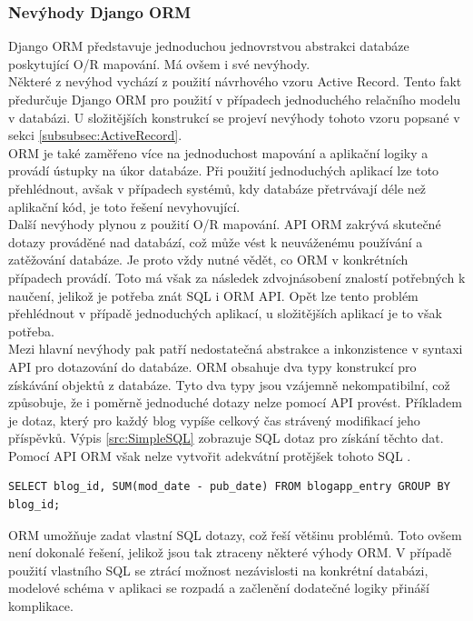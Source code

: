 \documentclass[ing,male,java,dept456]{diploma}						%
\begin{document}
\subsubsection{Nevýhody Django ORM}

Django ORM představuje jednoduchou jednovrstvou abstrakci databáze poskytující O/R mapování. Má ovšem i své nevýhody. \\
Některé z nevýhod vychází z použití návrhového vzoru Active Record. Tento fakt předurčuje Django ORM pro použití v případech jednoduchého relačního modelu v databázi. U složitějších konstrukcí se projeví nevýhody tohoto vzoru popsané v sekci \ref{subsubsec:ActiveRecord}. \\
ORM je také zaměřeno více na jednoduchost mapování a aplikační logiky a provádí ústupky na úkor databáze. Při použití jednoduchých aplikací lze toto přehlédnout, avšak v případech systémů, kdy databáze přetrvávají déle než aplikační kód, je toto řešení nevyhovující. \\
Další nevýhody plynou z použití O/R mapování. API ORM zakrývá skutečné dotazy prováděné nad databází, což může vést k neuváženému používání a zatěžování databáze. Je proto vždy nutné vědět, co ORM v konkrétních případech provádí. Toto má však za následek zdvojnásobení znalostí potřebných k naučení, jelikož je potřeba znát SQL i ORM API. Opět lze tento problém přehlédnout v případě jednoduchých aplikací, u složitějších aplikací je to však potřeba. \\
Mezi hlavní nevýhody pak patří nedostatečná abstrakce a inkonzistence v syntaxi API pro dotazování do databáze. ORM obsahuje dva typy konstrukcí pro získávání objektů z databáze. Tyto dva typy jsou vzájemně nekompatibilní, což způsobuje, že i poměrně jednoduché dotazy nelze pomocí API provést. Příkladem je dotaz, který pro každý blog vypíše celkový čas strávený modifikací jeho příspěvků. Výpis \ref{src:SimpleSQL} zobrazuje SQL dotaz pro získání těchto dat. Pomocí API ORM však nelze vytvořit adekvátní protějšek tohoto SQL \cite{dj-dis}.
\begin{lstlisting}[style=customsql, label=src:SimpleSQL, caption={Příklad dotazu, který nelze provést pomocí Django ORM API}]
SELECT blog_id, SUM(mod_date - pub_date) FROM blogapp_entry GROUP BY blog_id;
\end{lstlisting}

ORM umožňuje zadat vlastní SQL dotazy, což řeší většinu problémů. Toto ovšem není dokonalé řešení, jelikož jsou tak ztraceny některé výhody ORM. V případě použití vlastního SQL se ztrácí možnost nezávislosti na konkrétní databázi, modelové schéma v aplikaci se rozpadá a začlenění dodatečné logiky přináší komplikace. \\
\end{document}
